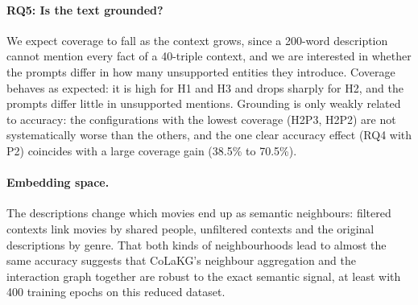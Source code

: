 \documentclass[a4paper,11pt]{article}
\begin{document}
\paragraph{RQ5: Is the text grounded?} We expect coverage to fall as the context grows, since a 200-word description cannot mention every fact of a 40-triple context, and we are interested in whether the prompts differ in how many unsupported entities they introduce. Coverage behaves as expected: it is high for H1 and H3 and drops sharply for H2, and the prompts differ little in unsupported mentions. Grounding is only weakly related to accuracy: the configurations with the lowest coverage (H2P3, H2P2) are not systematically worse than the others, and the one clear accuracy effect (RQ4 with P2) coincides with a large coverage gain (38.5\% to 70.5\%).

\paragraph{Embedding space.} The descriptions change which movies end up as semantic neighbours: filtered contexts link movies by shared people, unfiltered contexts and the original descriptions by genre. That both kinds of neighbourhoods lead to almost the same accuracy suggests that CoLaKG's neighbour aggregation and the interaction graph together are robust to the exact semantic signal, at least with 400 training epochs on this reduced dataset.
\end{document}

